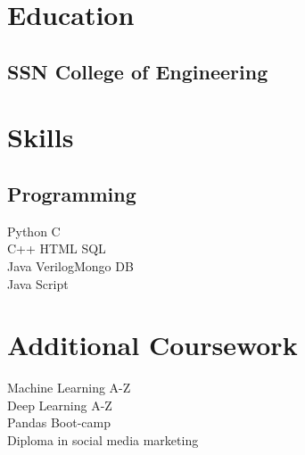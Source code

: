 \documentclass[]{deedy-resume-reversed}
\begin{document}
\begin{minipage}[t]{0.33\textwidth}


\section{Education}

\subsection{SSN College of Engineering }
\sectionsep


\section{Skills}
\subsection{Programming}
\textbullet{} Python\textbullet{} C \\
\textbullet{} C++ \textbullet{}HTML\textbullet{} SQL\\
\textbullet{}Java 
\textbullet{} Verilog\textbullet{}Mongo DB\\
\textbullet{}Java Script



\section{Additional Coursework}
 
Machine Learning A-Z \\
Deep Learning A-Z\\
Pandas Boot-camp \\
Diploma in social media marketing\\
\sectionsep



\end{minipage}
\end{document}
